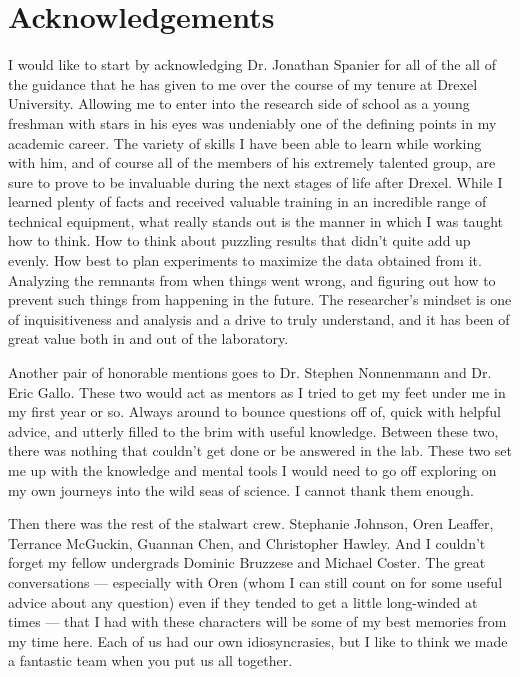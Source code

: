 \chapter*{Acknowledgements}


I would like to start by acknowledging Dr. Jonathan Spanier for all of the all of the guidance that he has given to me over the course of my tenure at Drexel University. Allowing me to enter into the research side of school as a young freshman with stars in his eyes was undeniably one of the defining points in my academic career. The variety of skills I have been able to learn while working with him, and of course all of the members of his extremely talented group, are sure to prove to be invaluable during the next stages of life after Drexel. While I learned plenty of facts and received valuable training in an incredible range of technical equipment, what really stands out is the manner in which I was taught how to think. How to think about puzzling results that didn't quite add up evenly. How best to plan experiments to maximize the data obtained from it. Analyzing the remnants from when things went wrong, and figuring out how to prevent such things from happening in the future. The researcher's mindset is one of inquisitiveness and analysis and a drive to truly understand, and it has been of great value both in and out of the laboratory. 

Another pair of honorable mentions goes to Dr. Stephen Nonnenmann and Dr. Eric Gallo. These two would act as mentors as I tried to get my feet under me in my first year or so. Always around to bounce questions off of, quick with helpful advice, and utterly filled to the brim with useful knowledge. Between these two, there was nothing that couldn't get done or be answered in the lab. These two set me up with the knowledge and mental tools I would need to go off exploring on my own journeys into the wild seas of science. I cannot thank them enough. 

Then there was the rest of the stalwart crew. Stephanie Johnson, Oren Leaffer, Terrance McGuckin, Guannan Chen, and Christopher Hawley. And I couldn't forget my fellow undergrads Dominic Bruzzese and Michael Coster. The great conversations --- especially with Oren (whom I can still count on for some useful advice about any question) even if they tended to get a little long-winded at times --- that I had with these characters will be some of my best memories from my time here. Each of us had our own idiosyncrasies, but I like to think we made a fantastic team when you put us all together. 


